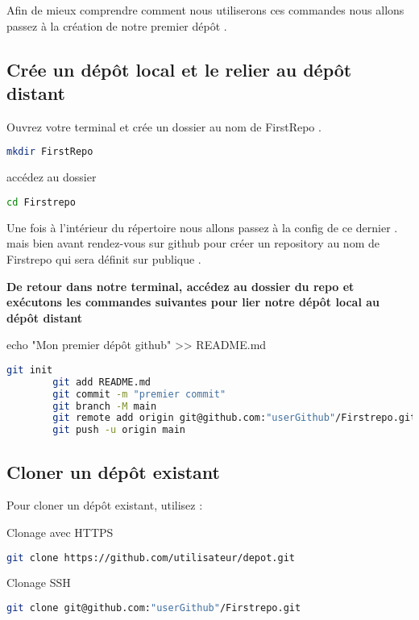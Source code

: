 \documentclass{article}
\begin{document}
	Afin de mieux comprendre comment nous utiliserons ces commandes  nous allons passez à la création de notre premier dépôt . 
	
	 \subsection{Crée un dépôt local et le relier au dépôt distant }
	 
	 Ouvrez votre terminal et crée un dossier au nom de FirstRepo . 
	
	\begin{lstlisting}[language=bash]
	mkdir FirstRepo
	\end{lstlisting}
	\newpage
	accédez au dossier 
	
	\begin{lstlisting}[language=bash]
	    cd Firstrepo
	\end{lstlisting}
	\smallskip  \smallskip
	
	Une fois à l'intérieur du répertoire nous allons passez à la config de ce dernier . mais bien avant rendez-vous sur github pour créer un repository au nom de Firstrepo qui sera définit sur publique .\smallskip  \smallskip 
	
	\textbf{De retour dans notre terminal, accédez au dossier du repo et exécutons les commandes suivantes pour lier notre dépôt local au dépôt distant} 
	
	 echo "Mon premier dépôt github" >> README.md 
	\begin{lstlisting}[language=bash]
		git init 
		git add README.md 
		git commit -m "premier commit" 
		git branch -M main 
		git remote add origin git@github.com:"userGithub"/Firstrepo.git
		git push -u origin main
	\end{lstlisting}

	\subsection{Cloner un dépôt existant}
	Pour cloner un dépôt existant, utilisez :
	
	Clonage avec HTTPS 
	\begin{lstlisting}[language=bash]
		git clone https://github.com/utilisateur/depot.git
	\end{lstlisting}
	
	Clonage SSH
	\begin{lstlisting}[language=bash]
		git clone git@github.com:"userGithub"/Firstrepo.git
	\end{lstlisting}
	
\end{document}
